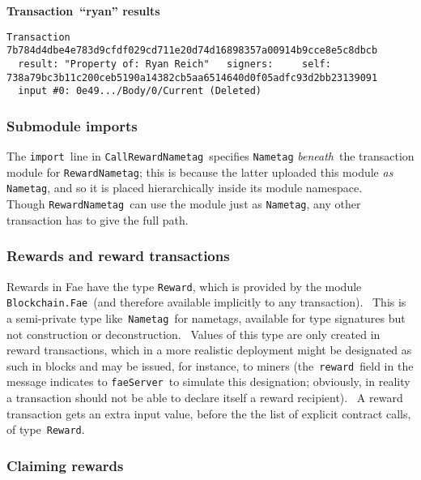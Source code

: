 \documentclass[11pt]{article}
\newcommand{\codeblock}[1]{\begin{mdframed}[
    backgroundcolor=header-color,
    linecolor=header-color,
    innertopmargin=10pt,
    ]{\texttt{#1}}\end{mdframed}}
\begin{document}
\textbf{Transaction “ryan” results}

\codeblock{Transaction 7b784d4dbe4e783d9cfdf029cd711e20d74d16898357a00914b9cce8e5c8dbcb\newline
  result: "Property of: Ryan Reich"\newline
  signers:\newline
    self: 738a79bc3b11c200ceb5190a14382cb5aa6514640d0f05adfc93d2bb23139091\newline
  input \#0: 0e49...\slash{}Body\slash{}0\slash{}Current (Deleted)}

\subsubsection{Submodule imports}
\vspace{5.5pt}

The \texttt{import} line in \texttt{CallRewardNametag} specifies \texttt{Nametag} \textit{beneath} the transaction module for \texttt{RewardNametag}; this is because the latter uploaded this module \textit{as} \texttt{Nametag}, and so it is placed hierarchically inside its module namespace.   Though \texttt{RewardNametag} can use the module just as \texttt{Nametag}, any other transaction has to give the full path.

\subsubsection{Rewards and reward transactions}
\vspace{5.5pt}

Rewards in Fae have the type \texttt{Reward}, which is provided by the module \texttt{Blockchain.Fae} (and therefore available implicitly to any transaction).  This is a semi-private type like \texttt{Nametag} for nametags, available for type signatures but not construction or deconstruction.  Values of this type are only created in reward transactions, which in a more realistic deployment might be designated as such in blocks and may be issued, for instance, to miners (the \texttt{reward} field in the message indicates to \texttt{faeServer} to simulate this designation; obviously, in reality a transaction should not be able to declare itself a reward recipient).  A reward transaction gets an extra input value, before the the list of explicit contract calls, of type \texttt{Reward}.

\subsubsection{Claiming rewards}
\vspace{5.5pt}
\end{document}
